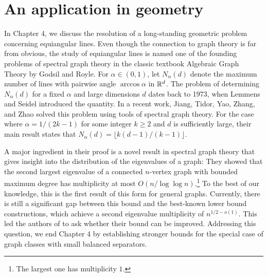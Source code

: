 \section{An application in geometry}

In Chapter 4, we discuss the resolution of a long-standing geometric problem concerning equiangular lines. 
Even though the connection to graph theory is far from obvious, the study of equiangular lines is named one of the founding problems of spectral graph theory in the classic textbook Algebraic Graph Theory \cite{godsilroyle} by Godsil and Royle.
For $\alpha \in (0, 1)$, let $N_\alpha (d)$ denote the maximum number of lines with pairwise angle $\arccos \alpha$ in $\mathbb{R}^d$. 
The problem of determining $N_\alpha (d)$ for a fixed $\alpha$ and large dimensions $d$ dates back to 1973, when Lemmens and Seidel \cite{lemmensseidel} introduced the quantity.
In a recent work, Jiang, Tidor, Yao, Zhang, and Zhao \cite{equiangular} solved this problem using tools of spectral graph theory. 
For the case where $\alpha = 1 / (2k - 1)$ for some integer $k \ge 2$ and $d$ is sufficiently large, their main result states that $N_\alpha(d) = \lfloor k (d - 1) / (k - 1) \rfloor$.

A major ingredient in their proof is a novel result in spectral graph theory that gives insight into the distribution of the eigenvalues of a graph:
They showed that the second largest eigenvalue of a connected $n$-vertex graph with bounded maximum degree has multiplicity at most $O(n / \log \log n)$.\footnote{The largest one has multiplicity $1$.}
To the best of our knowledge, this is the first result of this form for general graphs.
Currently, there is still a significant gap between this bound and the best-known lower bound constructions, which achieve a second eigenvalue multiplicity of $n^{1 /2 - o(1)}$.
This led the authors of \cite{equiangular} to ask whether their bound can be improved.
Addressing this question, we end Chapter 4 by establishing stronger bounds for the special case of graph classes with small balanced separators.

